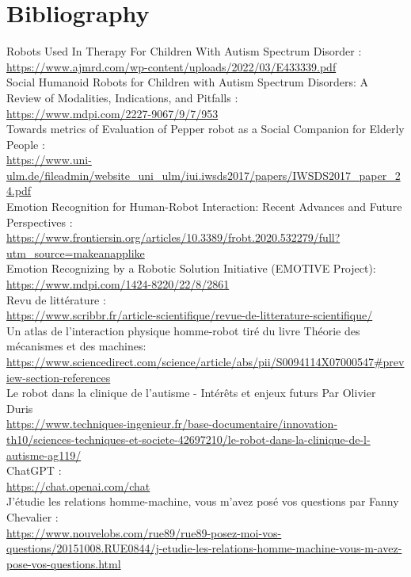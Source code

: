 \chapter{Bibliography}

Robots Used In Therapy For Children With Autism Spectrum Disorder : \\
\url{https://www.ajmrd.com/wp-content/uploads/2022/03/E433339.pdf} \\

Social Humanoid Robots for Children with Autism Spectrum Disorders: A Review of Modalities, Indications, and Pitfalls : \\
\url{https://www.mdpi.com/2227-9067/9/7/953}\\

Towards metrics of Evaluation of Pepper robot as a Social Companion for Elderly People : \\
\url{https://www.uni-ulm.de/fileadmin/website_uni_ulm/iui.iwsds2017/papers/IWSDS2017_paper_24.pdf }\\

Emotion Recognition for Human-Robot Interaction: Recent Advances and Future Perspectives : \\
\url{https://www.frontiersin.org/articles/10.3389/frobt.2020.532279/full?utm_source=makeanapplike}\\

Emotion Recognizing by a Robotic Solution Initiative (EMOTIVE Project): \\
\url{https://www.mdpi.com/1424-8220/22/8/2861} \\

Revu de littérature :\\
\url{https://www.scribbr.fr/article-scientifique/revue-de-litterature-scientifique/} \\

Un atlas de l'interaction physique homme-robot tiré du livre Théorie des mécanismes et des machines: \\
\url{https://www.sciencedirect.com/science/article/abs/pii/S0094114X07000547#preview-section-references} \\

Le robot dans la clinique de l’autisme - Intérêts et enjeux futurs Par Olivier Duris\\
\url{https://www.techniques-ingenieur.fr/base-documentaire/innovation-th10/sciences-techniques-et-societe-42697210/le-robot-dans-la-clinique-de-l-autisme-ag119/}\\
ChatGPT :\\
\url{https://chat.openai.com/chat}\\
\newpage
J’étudie les relations homme-machine, vous m’avez posé vos questions par Fanny Chevalier : \\
\url{https://www.nouvelobs.com/rue89/rue89-posez-moi-vos-questions/20151008.RUE0844/j-etudie-les-relations-homme-machine-vous-m-avez-pose-vos-questions.html}\\

